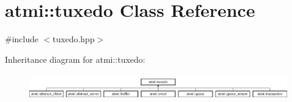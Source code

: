 \hypertarget{classatmi_1_1tuxedo}{\section{atmi\+:\+:tuxedo Class Reference}
\label{classatmi_1_1tuxedo}
}


{\ttfamily \#include $<$tuxedo.\+hpp$>$}

Inheritance diagram for atmi\+:\+:tuxedo\+:\begin{figure}[H]
\begin{center}
\leavevmode
\includegraphics[height=1.167883cm]{classatmi_1_1tuxedo}
\end{center}
\end{figure}
